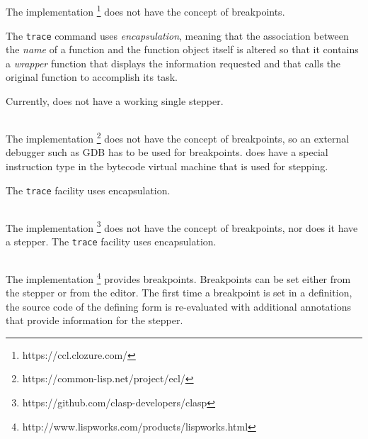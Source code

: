 \subsection{\ccl{}}

The \ccl{} \commonlisp{} implementation%
\footnote{https://ccl.clozure.com/}
does not have the concept of breakpoints.

The \ccl{} \texttt{trace} command uses \emph{encapsulation}, meaning
that the association between the \emph{name} of a function and the
function object itself is altered so that it contains a \emph{wrapper}
function that displays the information requested and that calls the
original function to accomplish its task.

Currently, \ccl{} does not have a working single stepper.

\subsection{\ecl{}}

The \ecl{} \commonlisp{} implementation%
\footnote{https://common-lisp.net/project/ecl/}
does not have the concept of breakpoints, so an external debugger such
as GDB has to be used for breakpoints.  \ecl{} does have a special
instruction type in the bytecode virtual machine that is used for
stepping.

The \texttt{trace} facility uses encapsulation.

\subsection{\clasp{}}

The \clasp{} \commonlisp{} implementation%
\footnote{https://github.com/clasp-developers/clasp}
does not have the concept of breakpoints, nor does it have a stepper.
The \texttt{trace} facility uses encapsulation.

\subsection{\lispworks{}}

The \lispworks{} \commonlisp{} implementation%
\footnote{http://www.lispworks.com/products/lispworks.html}
provides breakpoints.  Breakpoints can be set either from the stepper
or from the editor.  The first time a breakpoint is set in a
definition, the source code of the defining form is re-evaluated with
additional annotations that provide information for the stepper.

